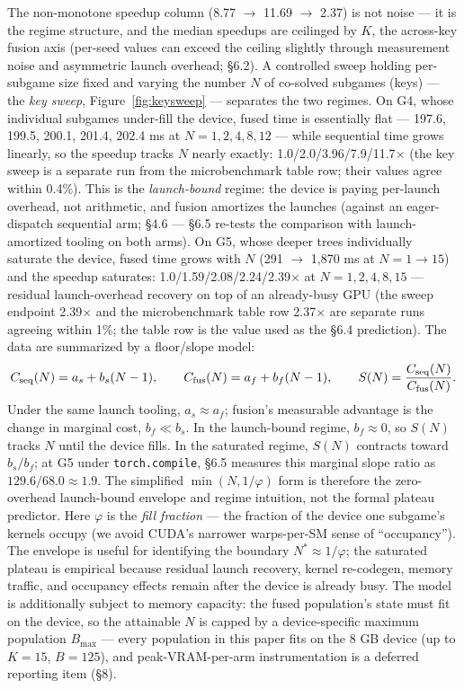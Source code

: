 \documentclass[11pt]{article}
\begin{document}
The non-monotone speedup column (8.77 $\to$ 11.69 $\to$ 2.37) is not noise --- it is the
regime structure, and the median speedups are ceilinged by $K$, the across-key fusion
axis (per-seed values can exceed the ceiling slightly through measurement noise and
asymmetric launch overhead; \S6.2). A controlled sweep holding per-subgame size fixed
and varying the number $N$ of co-solved subgames (keys) --- the \emph{key sweep},
Figure~\ref{fig:keysweep} --- separates the two regimes. On G4, whose individual
subgames under-fill the device, fused time is essentially flat --- 197.6, 199.5, 200.1,
201.4, 202.4 ms at $N = 1, 2, 4, 8, 12$ --- while sequential time grows linearly, so the
speedup tracks $N$ nearly exactly: 1.0/2.0/3.96/7.9/11.7$\times$ (the key sweep is a
separate run from the microbenchmark table row; their values agree within 0.4\%). This
is the \emph{launch-bound} regime: the device is paying per-launch overhead, not
arithmetic, and fusion amortizes the launches (against an eager-dispatch sequential arm;
\S4.6 --- \S6.5 re-tests the comparison with launch-amortized tooling on both arms). On G5, whose deeper trees individually saturate the device, fused time grows
with $N$ (291 $\to$ 1,870 ms at $N = 1 \to 15$) and the speedup saturates:
1.0/1.59/2.08/2.24/2.39$\times$ at $N = 1, 2, 4, 8, 15$ --- residual launch-overhead
recovery on top of an already-busy GPU (the sweep endpoint 2.39$\times$ and the
microbenchmark table row 2.37$\times$ are separate runs agreeing within 1\%; the table
row is the value used as the \S6.4 prediction). The data are summarized by a
floor/slope model:
\begin{equation}
C_{\rm seq}(N)=a_s+b_s(N-1),\qquad
C_{\rm fus}(N)=a_f+b_f(N-1),\qquad
S(N)=\frac{C_{\rm seq}(N)}{C_{\rm fus}(N)} .
\label{eq:floorslope}
\end{equation}
Under the same launch tooling, $a_s\approx a_f$; fusion's measurable advantage is the
change in marginal cost, $b_f \ll b_s$. In the launch-bound regime, $b_f\approx0$, so
$S(N)$ tracks $N$ until the device fills. In the saturated regime, $S(N)$ contracts
toward $b_s/b_f$; at G5 under \texttt{torch.compile}, \S6.5 measures this marginal
slope ratio as $129.6/68.0\approx1.9$. The simplified
$\min(N,1/\varphi)$ form is therefore the zero-overhead launch-bound envelope and
regime intuition, not the formal plateau predictor. Here $\varphi$ is the \emph{fill
fraction} --- the fraction of the device one subgame's kernels occupy (we avoid CUDA's
narrower warps-per-SM sense of ``occupancy''). The envelope is useful for identifying
the boundary $N^*\approx1/\varphi$; the saturated plateau is empirical because residual
launch recovery, kernel re-codegen, memory traffic, and occupancy effects remain after
the device is already busy. The model is additionally subject to memory capacity: the
fused population's state must fit on the device, so the attainable $N$ is capped by a
device-specific maximum population $B_{\max}$ --- every population in this paper fits on
the 8 GB device (up to $K{=}15$, $B{=}125$), and peak-VRAM-per-arm instrumentation is a
deferred reporting item (\S8).
\end{document}
